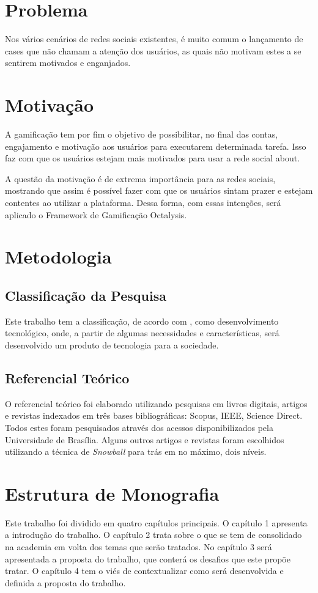 \section{Problema}
Nos vários cenários de redes sociais existentes, é muito comum o lançamento de cases
que não chamam a atenção dos usuários, as quais não motivam estes a se sentirem
motivados e enganjados.
\section{Motivação}
A gamificação tem por fim o objetivo de 
possibilitar, no final das contas, engajamento e motivação aos usuários para
executarem determinada tarefa. Isso faz com que os usuários estejam mais
motivados para usar a rede social about. 

A questão da motivação é de extrema importância para as redes sociais, mostrando
que assim é possível fazer com que os usuários sintam prazer e estejam
contentes ao utilizar a plataforma. Dessa forma, com essas intenções,
será aplicado o Framework de Gamificação Octalysis.

\section{Metodologia}
\subsection{Classificação da Pesquisa}
\label{sub:classifica_o_da_pesquisa}
Este trabalho tem a classificação, de acordo com \cite{gil2010metodos}, como desenvolvimento tecnológico,
onde, a partir de algumas necessidades e características, será desenvolvido um produto
de tecnologia para a sociedade.

\subsection{Referencial Teórico}
\label{sub:referencial_te_rico}
O referencial teórico foi elaborado utilizando pesquisas em livros digitais, artigos e
revistas indexados em três bases bibliográficas: Scopus, IEEE, Science Direct. Todos estes
foram pesquisados através dos acessos disponibilizados pela Universidade de Brasília.
Alguns outros artigos e revistas foram escolhidos utilizando a técnica de
\textit{Snowball} para trás em no máximo, dois níveis.


\section{Estrutura de Monografia}
Este trabalho foi dividido em quatro capítulos principais. O capítulo 1 apresenta a introdução
do trabalho. O capítulo 2 trata sobre o que se tem de consolidado na academia em volta
dos temas que serão tratados. No capítulo 3 será apresentada a proposta do trabalho, que conterá
os desafios que este propõe tratar. O capítulo 4 tem o viés de contextualizar como será
desenvolvida e definida a proposta do trabalho.
